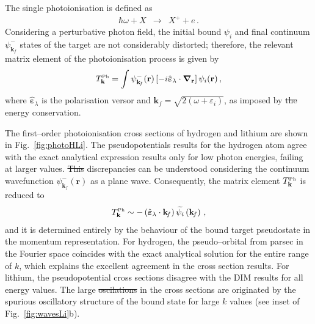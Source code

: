 \documentclass[10pt]{article}
\providecommand{\DIFaddtex}[1]{{\protect\color{blue}\uwave{#1}}} %
\providecommand{\DIFdeltex}[1]{{\protect\color{red}\sout{#1}}}                      %
\providecommand{\DIFaddbegin}{} %
\providecommand{\DIFaddend}{} %
\providecommand{\DIFdelbegin}{} %
\providecommand{\DIFdelend}{} %
\providecommand{\DIFadd}[1]{\texorpdfstring{\DIFaddtex{#1}}{#1}} %
\providecommand{\DIFdel}[1]{\texorpdfstring{\DIFdeltex{#1}}{}} %
\newcommand{\DIFscaledelfig}{0.5}
\newlength{\DIFdelgraphicswidth} %
\newlength{\DIFdelgraphicsheight} %
\newcommand{\DIFaddincludegraphics}[2][]{{\color{blue}\fbox{\DIFOincludegraphics[#1]{#2}}}} %
\newcommand{\DIFdelincludegraphics}[2][]{%
\sbox{\DIFdelgraphicsbox}{\DIFOincludegraphics[#1]{#2}}%
\settoboxwidth{\DIFdelgraphicswidth}{\DIFdelgraphicsbox} %
\settoboxtotalheight{\DIFdelgraphicsheight}{\DIFdelgraphicsbox} %
\scalebox{\DIFscaledelfig}{%
\parbox[b]{\DIFdelgraphicswidth}{\usebox{\DIFdelgraphicsbox}\\[-\baselineskip] \rule{\DIFdelgraphicswidth}{0em}}\llap{\resizebox{\DIFdelgraphicswidth}{\DIFdelgraphicsheight}{%
\setlength{\unitlength}{\DIFdelgraphicswidth}%
\begin{picture}(1,1)%
\thicklines\linethickness{2pt} %
{\color[rgb]{1,0,0}\put(0,0){\framebox(1,1){}}}%
{\color[rgb]{1,0,0}\put(0,0){\line( 1,1){1}}}%
{\color[rgb]{1,0,0}\put(0,1){\line(1,-1){1}}}%
\end{picture}%
}\hspace*{3pt}}} %
} %
\DeclareRobustCommand{\DIFaddbegin}{\DIFOaddbegin \let\includegraphics\DIFaddincludegraphics} %
\DeclareRobustCommand{\DIFaddend}{\DIFOaddend \let\includegraphics\DIFOincludegraphics} %
\DeclareRobustCommand{\DIFdelbegin}{\DIFOdelbegin \let\includegraphics\DIFdelincludegraphics} %
\DeclareRobustCommand{\DIFdelend}{\DIFOaddend \let\includegraphics\DIFOincludegraphics} %
\begin{document}
The single photoionisation is defined as
\begin{eqnarray}
 \hbar\omega + X &\rightarrow& X^+ + e\,.
\end{eqnarray}
Considering a perturbative photon field, the initial bound $\psi_{i}$ 
and final continuum $\psi_{\mathbf{k}_{\!f}}^-$ states of the target are
not considerably distorted; therefore, the relevant matrix element of the 
photoionisation process is given by
\begin{equation}
 T_{\mathbf{k}}^{\mbox{\tiny Ph}} = \int{
 \psi_{\mathbf{k}_{\!f}}^-(\mathbf{r}) 
 \left[-i \hat{\boldsymbol{\varepsilon}}_\lambda \cdot 
 \boldsymbol{\nabla}_\mathbf{r}\right] 
 \psi_{i}(\mathbf{r})}\,,
\end{equation}
where $\hat{\boldsymbol{\varepsilon}}_\lambda$ is the polarisation 
versor and $\mathbf{k}_{\!f}=\sqrt{2(\omega+\varepsilon_i)}$, as imposed 
by \DIFdelbegin \DIFdel{the }\DIFdelend energy conservation.

The first--order photoionisation cross sections of hydrogen and 
lithium are shown in Fig.~\ref{fig:photoHLi}. The pseudopotentials 
results for the hydrogen atom agree with the exact analytical 
expression results only for low photon energies, failing at larger values. 
\DIFdelbegin \DIFdel{This }\DIFdelend \DIFaddbegin \DIFadd{These }\DIFaddend discrepancies can be understood considering the continuum 
wavefunction $\psi_{\mathbf{k}_{\!f}}^-(\mathbf{r})$ as a plane wave. 
Consequently, the matrix element $T_{\mathbf{k}}^{\mbox{\tiny Ph}}$ 
is reduced to
\begin{equation}
 T_{\mathbf{k}}^{\mbox{\tiny Ph}} \sim 
 -\left(\hat{\boldsymbol{\varepsilon}}_\lambda \cdot \mathbf{k}_{\!f} \right)
 \widetilde{\psi_i} \left(\mathbf{k}_{\!f}\right)\,,
\end{equation}
and it is determined entirely by the behaviour of the bound target 
pseudostate in the momentum representation. For hydrogen, the 
pseudo--orbital from {\sc parsec} in the Fourier space coincides with 
the exact 
analytical solution for the entire range of $k$, which explains the 
excellent agreement in the cross section results.
For lithium, the pseudopotential cross sections disagree with the DIM 
results for all energy values. The large \DIFdelbegin \DIFdel{oscilations }\DIFdelend \DIFaddbegin \DIFadd{oscillations }\DIFaddend in the cross sections
are originated by the spurious oscillatory structure of the bound state
for large  $k$ values (see inset of Fig.~\ref{fig:wavesLi}b).
\end{document}
